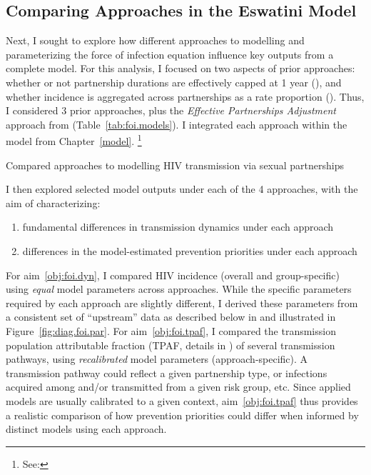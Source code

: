 \subsection{Comparing Approaches in the Eswatini Model}\label{foi.exp.model}
Next, I sought to explore how different approaches to
modelling and parameterizing the force of infection equation
influence key outputs from a complete model.
For this analysis, I focused on two aspects of prior approaches:
whether or not partnership durations are effectively capped at 1 year (), and
whether incidence is aggregated across partnerships as a rate \vs proportion ().
Thus, I considered 3 prior approaches,
plus the \emph{Effective Partnerships Adjustment} approach from 
(Table~\ref{tab:foi.models}).
I integrated each approach within the model from Chapter~\ref{model}.%
\footnote{See: }
\begin{table}[h]
  \centering
  \caption{Compared approaches to modelling HIV transmission via sexual partnerships}
  \label{tab:foi.models}
  
\end{table}
\par
I then explored selected model outputs under each of the 4 approaches,
with the aim of characterizing:
\begin{enumerate}
  \item \label{obj:foi.dyn}
  fundamental differences in transmission dynamics under each approach
  \item \label{obj:foi.tpaf}
  differences in the model-estimated prevention priorities under each approach
\end{enumerate}
For aim~\ref{obj:foi.dyn}, I compared HIV incidence (overall and group-specific)
using \emph{equal} model parameters across approaches.
While the specific parameters required by each approach are slightly different,
I derived these parameters from a consistent set of ``upstream'' data
as described below in  and illustrated in Figure~\ref{fig:diag.foi.par}.
For aim~\ref{obj:foi.tpaf}, I compared
the transmission population attributable fraction (TPAF, details in )
of several transmission pathways,
using \emph{recalibrated} model parameters (\ie approach-specific).
A transmission pathway could reflect a given partnership type,
or infections acquired among and/or transmitted from a given risk group, etc.
Since applied models are usually calibrated to a given context,
aim~\ref{obj:foi.tpaf} thus provides a realistic comparison of
how prevention priorities could differ when informed by distinct models using each approach.
